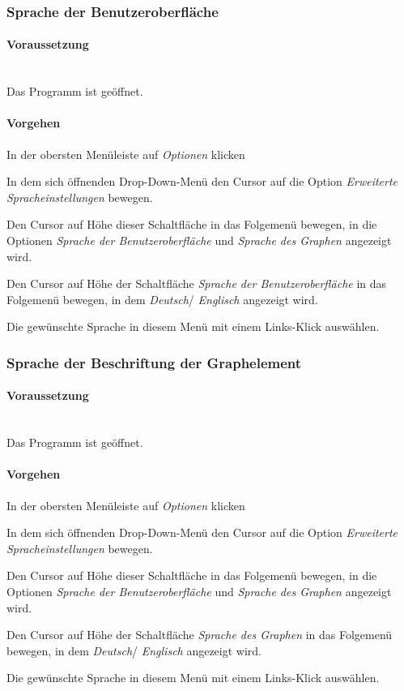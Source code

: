 \documentclass[enabledeprecatedfontcommands,fontsize=11pt,paper=a4,twoside]{scrartcl}
\newcounter{one}
\newcommand*{\condition}{\paragraph{Voraussetzung}$\;$ \vspace{0.2cm}\\}
\newcommand*{\action}{\paragraph{Vorgehen}}
\let\origenumerate\enumerate
\let\origendenumerate\endenumerate
\renewenvironment{enumerate}{\origenumerate \addtolength{\itemsep}{-10.0pt}}{\origendenumerate}
\begin{document}
\subsubsection{Sprache der Benutzeroberfläche}
		\condition 	
		Das Programm ist geöffnet.
		\action
		\begin{enumerate}
				\item In der obersten Menüleiste auf \textit{Optionen} klicken 
				\item In dem sich öffnenden Drop-Down-Menü den Cursor auf die Option \textit{Erweiterte Spracheinstellungen} bewegen.
				\item Den Cursor auf Höhe dieser Schaltfläche in das Folgemenü bewegen, in die Optionen \textit{Sprache der Benutzeroberfläche} und \textit{Sprache des Graphen} angezeigt wird.
				\item Den Cursor auf Höhe der Schaltfläche \textit{Sprache der Benutzeroberfläche} in das Folgemenü bewegen, in dem \textit{Deutsch}/ \textit{Englisch} angezeigt wird.
				\item Die gewünschte Sprache in diesem Menü mit einem Links-Klick auswählen. \\
		\end{enumerate}
	 		
\subsubsection{Sprache der Beschriftung der Graphelement}
		\condition 	
		Das Programm ist geöffnet.
		\action
		\begin{enumerate}
				\item In der obersten Menüleiste auf \textit{Optionen} klicken 
				\item In dem sich öffnenden Drop-Down-Menü den Cursor auf die Option \textit{Erweiterte Spracheinstellungen} bewegen.
				\item Den Cursor auf Höhe dieser Schaltfläche in das Folgemenü bewegen, in die Optionen \textit{Sprache der Benutzeroberfläche} und \textit{Sprache des Graphen} angezeigt wird.
				\item Den Cursor auf Höhe der Schaltfläche \textit{Sprache des Graphen} in das Folgemenü bewegen, in dem \textit{Deutsch}/ \textit{Englisch} angezeigt wird.
				\item Die gewünschte Sprache in diesem Menü mit einem Links-Klick auswählen.
		\end{enumerate}
	 	
\end{document}
